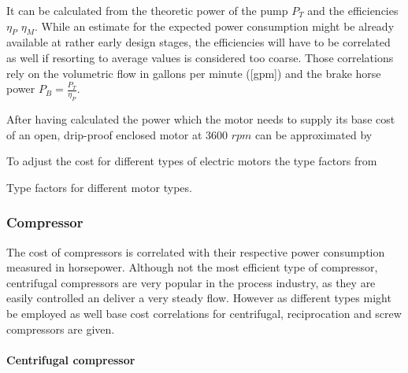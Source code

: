 			It can be calculated from the theoretic power of the pump $P_T$ and the efficiencies $\eta_P$
			$\eta_M$. While an estimate for the expected power consumption might be already available at
			rather early design stages, the efficiencies will have to be correlated as well if resorting
			to average values is considered too coarse. Those correlations rely on the volumetric flow in
			gallons per minute ([gpm]) and the brake horse power $P_B = \frac{P_T}{\eta_P}$.
			
			
			After having calculated the power which the motor needs to supply its base cost of an open,
			drip-proof enclosed motor at 3600 $rpm$ can be approximated by
			
			To adjust the cost for different types of electric motors the type factors from 
			
            \begin{table}
                \footnotesize
                \center
                
                \caption{Type factors for different motor types.}
                \label{tab:pump:MotorTypes}
	        \end{table}

	\subsubsection{Compressor}
		The cost of compressors is correlated with their respective power consumption measured in horsepower.
		Although not the most efficient type of compressor, centrifugal compressors are very popular in the
		process industry, as they are easily controlled an deliver a very steady flow. However as different
		types might be employed as well base cost correlations for centrifugal, reciprocation and screw
		compressors are given.
		
			\paragraph{Centrifugal compressor}
			
